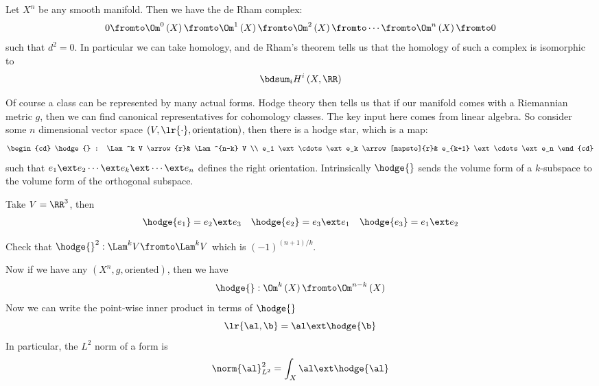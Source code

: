 \documentclass{amsart}
\begin{document}
Let $X^n$ be any smooth manifold. 
Then we have the de Rham complex:
\begin{equation}
0\fromto \Om^0\left( X \right) \fromto 
\Om^1\left( X \right) \fromto 
\Om^2\left( X \right) \fromto \cdots
\fromto
\Om^n\left( X \right) \fromto 0
\end{equation}
such that $d^2 = 0$. 
In particular we can take homology, and de Rham's theorem tells us that the homology of 
such a complex is isomorphic to 
\begin{equation}
\bdsum_i H^i\left( X , \RR \right)
\end{equation}

Of course a class can be represented by many actual forms.
Hodge theory then tells us that if our manifold comes with a Riemannian metric $g$, 
then we can find canonical representatives for cohomology classes.
The key input here comes from linear algebra. 
So consider some $n$ dimensional vector space $\left( V , \lr{\cdot} , \text{orientation} \right)$,
then there is a hodge star, which is a map:
\begin{equation}
\begin{cd}
\hodge{} : \Lam^k V \arrow{r}&
\Lam^{n-k} V
\\
e_1 \ext \cdots \ext e_k
\arrow[mapsto]{r}&
e_{k+1} \ext \cdots \ext e_n
\end{cd}
\end{equation}
such that $e_1 \ext e_2 \cdots \ext e_k \ext \cdots \ext e_n$
defines the right orientation.
Intrinsically $\hodge{}$ sends the volume form of a $k$-subspace to the volume form of 
the orthogonal subspace.

\begin{exm}
Take $V = \RR^3$, then 
\begin{align}
\hodge{e_1} = e_2 \ext e_3
&&
\hodge{e_2} = e_3 \ext e_1
&&
\hodge{e_3} = e_1 \ext e_2
\end{align}
\begin{exr}
Check that $\hodge{}^2 : \Lam^k V \fromto \Lam^k V$ which is
$\left( -1 \right)^{\left( n+1 \right) / k}$.
\end{exr}
\end{exm}

Now if we have any $\left( X^n , g , \text{oriented} \right)$, 
then we have
\begin{equation}
\hodge{}: \Om^k\left( X \right) \fromto \Om^{n-k} \left( X \right)
\end{equation}
Now we can write the point-wise inner product in terms of $\hodge{}$
\begin{equation}
\lr{\al,\b} = \al \ext\hodge{\b}
\end{equation}
In particular, the $L^2$ norm of a form is
\begin{equation}
\norm{\al}_{L^2}^2 = 
\int_X \al \ext \hodge{\al}
\end{equation}
\end{document}
